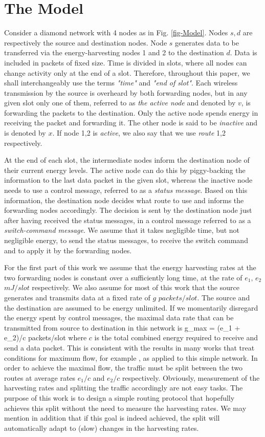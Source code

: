\documentclass[12 pt]{article}
\newcommand{\debug}[1]{\mbox{\tt #1}}
\renewcommand{\debug}[1]{}              \newcommand{\cmd}[1]{}
\newcommand{\2}{\>\>}
\newcommand{\3}{\>\>\>}
\newcommand{\4}{\>\>\>\>}
\newcommand{\5}{\>\>\>\>\>}
\newcommand{\6}{\>\>\>\>\>\>}
\newcommand{\7}{\6\>}
\newcommand{\8}{\6\2}
\newcommand{\sname}{}
\newcommand{\dcite}[1]{\cite{#1}\debug{[#1]}\cmd{dcite}}
\newcommand{\dref}[1]{\ref{#1}\debug{[#1]}\cmd{dref}}
\newcommand{\dlabelx}[1]{\debug{\fbox{\tiny #1}}\label{#1}}
\newcommand{\msec}[2]{\renewcommand{\sname}{}\section[#1
	\debug{\fbox {#2}}]{#1 \cmd{msec} \dlabelx{#2}}\markboth{\today}{Sec. \thesection}}
\begin{document}
\msec{The Model}{Model}

Consider a diamond network with 4 nodes as in Fig. \dref{fig-Model}.  Nodes $s,d$ are respectively the source and destination nodes.  Node $s$ generates data to be transferred via the energy-harvesting nodes 1 and 2 to the destination $d$.
Data is included in packets of fixed size. Time is divided in slots, where all nodes can change activity only at the end of a slot. Therefore, throughout this paper, we shall interchangeably use the terms \emph{"time"} and \emph{"end of slot"}.  Each wireless transmission by the source is overheard by both forwarding nodes, but in any given slot only one of them, referred to as \emph{the active node} and denoted by $v$, is forwarding the packets to the destination.  Only the active node spends energy in receiving the packet and forwarding it.  The other node is said to be \emph{inactive} and is denoted by $x$.  If node 1,2 is \emph{active}, we also say that we use \emph{route} 1,2 respectively.

At the end of each slot, the intermediate nodes inform the destination node of their current energy levels.  The active node can do this by piggy-backing the information to the last data packet in the given slot, whereas the inactive node needs to use a control message, referred to as a \emph{status message}.  Based on this information, the destination node decides what route to use and informs the forwarding nodes accordingly.  The decision is sent by the destination node just after having received the status messages, in a control message referred to as a \emph{switch-command message}.  We assume that it takes negligible time, but not negligible energy, to send the status messages, to receive the switch command and to apply it by the forwarding nodes.

For the first part of this work we assume that the energy harvesting rates at the two forwarding nodes is constant over a sufficiently long time, at the rate of $e_1,\,e_2$ $mJ / slot$ respectively.  We also assume for most of this work that the source generates and transmits data at a fixed rate of $g\,\, packets/slot$.  The source and the destination are assumed to be energy unlimited.
If we momentarily disregard the energy spent by control messages, the maximal data rate that can be transmitted from source to destination in this network is
\SB
g_{max} = (e_1 + e_2)/c\text{   ;    } packets/slot
\SE
where $c$ is the total combined energy required to receive and send a data packet.  This is consistent with the results in many works that treat conditions for maximum flow, for example \dcite{MSZ}, as applied to this simple network.  In order to achieve the maximal flow, the traffic must be split between the two routes at average rates $e_1/c$ and $e_2/c$ respectively.  Obviously, measurement of the harvesting rates and splitting the traffic accordingly are not easy tasks.  The purpose of this work is to design a simple routing protocol that hopefully achieves this split without the need to measure the harvesting rates.  We may mention in addition that if this goal is indeed achieved, the split will automatically adapt to (slow) changes in the harvesting rates.
\end{document}

